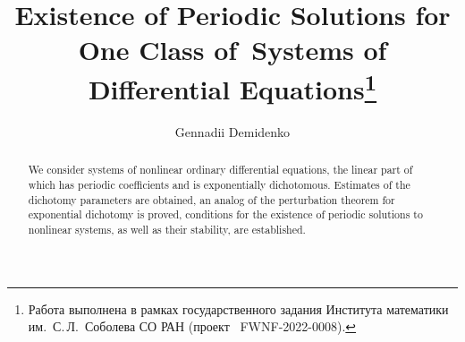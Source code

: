 \begin{englishtitle} %
\title{Existence of Periodic Solutions for One Class of~Systems of Differential Equations\thanks{Работа
выполнена в рамках государственного задания
Института математики им.~С.\,Л.~Соболева СО РАН 
(проект \textnumero~FWNF-2022-0008).
}}
\author{Gennadii Demidenko%
}

\maketitle

\begin{abstract}
We consider systems of nonlinear ordinary differential equations, the linear part of which has periodic coefficients and is exponentially dichotomous. Estimates of the dichotomy parameters are obtained, an analog of the perturbation theorem for exponential dichotomy is proved, conditions for the existence of periodic solutions to nonlinear systems, as well as their stability, are established.

\end{abstract}
\end{englishtitle}

\iffalse
%
%

